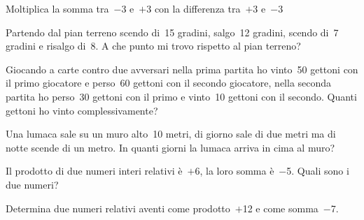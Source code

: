 \begin{multicols}{2}
\begin{esercizio}
 Moltiplica la somma tra~$-3$ e~$+3$ con la differenza tra~$+3$ e~$-3$
\end{esercizio}

\begin{esercizio}
 Partendo dal pian terreno scendo di~15 gradini, salgo~12 gradini, scendo di~7
gradini e risalgo di~8. A che punto mi trovo rispetto al pian terreno?
\end{esercizio}

\begin{esercizio}
 Giocando a carte contro due avversari nella prima partita ho vinto~50 gettoni 
con il primo giocatore e perso~60
gettoni con il secondo giocatore, nella seconda partita ho perso~30 gettoni con 
il primo e vinto~10 gettoni
con il secondo. Quanti gettoni ho vinto complessivamente?
\end{esercizio}


\begin{esercizio}
 Una lumaca sale su un muro alto~10 metri, di giorno sale di due metri ma di 
notte
scende di un metro. In quanti giorni la lumaca arriva in cima al muro?
\end{esercizio}

% 

\begin{esercizio}
 Il prodotto di due numeri interi relativi è~$+6$, la loro somma è~$-$5. Quali 
sono i due numeri?
\end{esercizio}


\begin{esercizio}
 Determina due numeri relativi aventi come prodotto~$+$12 e come somma~$-$7.
\end{esercizio}


\end{multicols}
